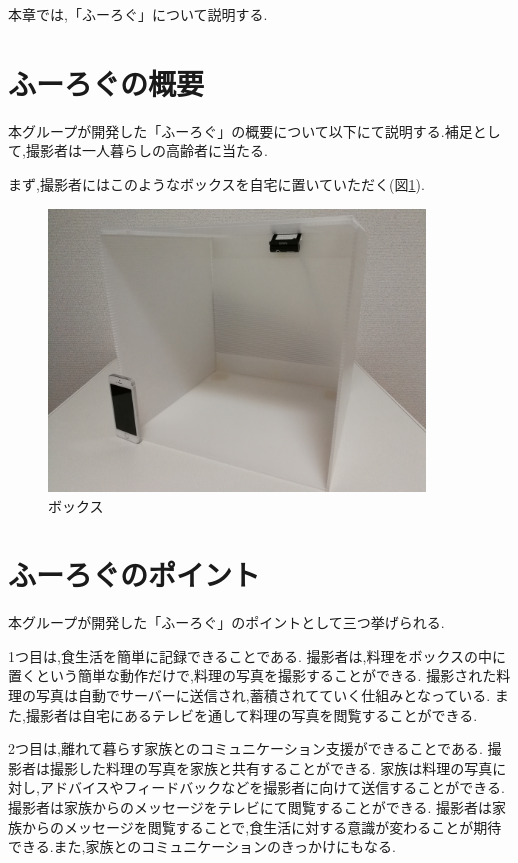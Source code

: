 \documentclass[../report]{subfiles}
\begin{document}
本章では,「ふーろぐ」について説明する.

\section{ふーろぐの概要}
本グループが開発した「ふーろぐ」の概要について以下にて説明する.補足として,撮影者は一人暮らしの高齢者に当たる.

まず,撮影者にはこのようなボックスを自宅に置いていただく(図\ref{fig:box}).
\begin{figure}[htbp]
    \begin{center}
        \includegraphics[width=10cm]{imgs/box.jpg}
        \caption{ボックス}
        \label{fig:box}
    \end{center}
\end{figure}

\section{ふーろぐのポイント}
本グループが開発した「ふーろぐ」のポイントとして三つ挙げられる.

1つ目は,食生活を簡単に記録できることである.
撮影者は,料理をボックスの中に置くという簡単な動作だけで,料理の写真を撮影することができる.
撮影された料理の写真は自動でサーバーに送信され,蓄積されてていく仕組みとなっている.
また,撮影者は自宅にあるテレビを通して料理の写真を閲覧することができる.

2つ目は,離れて暮らす家族とのコミュニケーション支援ができることである.
撮影者は撮影した料理の写真を家族と共有することができる.
家族は料理の写真に対し,アドバイスやフィードバックなどを撮影者に向けて送信することができる.
撮影者は家族からのメッセージをテレビにて閲覧することができる.
撮影者は家族からのメッセージを閲覧することで,食生活に対する意識が変わることが期待できる.また,家族とのコミュニケーションのきっかけにもなる.
\end{document}
